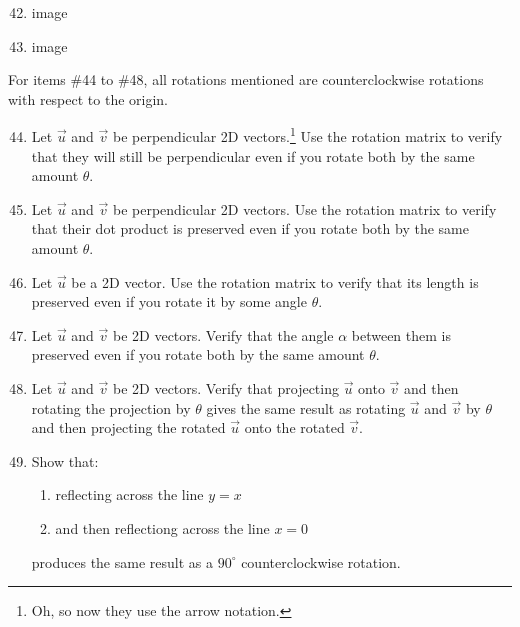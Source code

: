 \documentclass{article}
\begin{document}
\begin{enumerate}
    \setcounter{enumi}{41}
    \item image
    \item image
\end{enumerate}
\begin{center}
    \colorbox{CornflowerBlue!50}{
    \begin{minipage}[c]{0.9\textwidth}
        \centering
        For items \#44 to \#48, all rotations mentioned are counterclockwise rotations with respect to the origin. 
    \end{minipage}
    }
\end{center}
\begin{enumerate}
    \setcounter{enumi}{43}
    \item Let \(\overrightarrow{u}\) and \(\overrightarrow{v}\) be perpendicular 2D vectors.\footnote{Oh, so now they use the arrow notation.} Use the rotation matrix to verify that they will still be perpendicular even if you rotate both 
    by the same amount \(\theta\). 
    \item Let \(\overrightarrow{u}\) and \(\overrightarrow{v}\) be perpendicular 2D vectors. Use the rotation matrix to verify that their dot product is preserved even if you rotate both 
    by the same amount \(\theta\). 
    \item Let \(\overrightarrow{u}\) be a 2D vector. Use the rotation matrix to verify that its length is preserved even if you rotate it by some angle \(\theta\). 
    \item Let \(\overrightarrow{u}\) and \(\overrightarrow{v}\) be 2D vectors. Verify that the angle \(\alpha\) between them is preserved even if you rotate both by the same amount \(\theta\). 
    \item Let \(\overrightarrow{u}\) and \(\overrightarrow{v}\) be 2D vectors. Verify that projecting \(\overrightarrow{u}\) onto \(\overrightarrow{v}\) and then rotating the projection by \(\theta\) gives
    the same result as rotating \(\overrightarrow{u}\) and \(\overrightarrow{v}\) by \(\theta\) and then projecting the rotated \(\overrightarrow{u}\) onto the rotated \(\overrightarrow{v}\). 
    \item Show that:\begin{enumerate}
        \item reflecting across the line \(y = x\)
        \item and then reflectiong across the line \(x=0\)
    \end{enumerate} produces the same result as a \(90^\circ\) counterclockwise rotation.

\end{enumerate}
\end{document}
